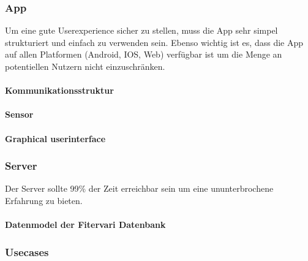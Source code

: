 \documentclass[12pt]{article}
\theoremstyle{definition}
\begin{document}
\subsubsection{App}
Um eine gute Userexperience sicher zu stellen, muss die App sehr simpel strukturiert und einfach zu verwenden sein. Ebenso wichtig ist es, dass die App auf allen Platformen (Android, IOS, Web) verfügbar ist um die Menge an potentiellen Nutzern nicht einzuschränken.

\paragraph{Kommunikationsstruktur}
\begin{center}

\end{center}
\pagebreak
\paragraph{Sensor}
\begin{center}

\end{center}

\paragraph{Graphical userinterface}
\begin{flushleft}

\end{flushleft}

\begin{flushleft}

\end{flushleft}

\subsubsection{Server}
Der Server sollte 99\% der Zeit erreichbar sein um eine ununterbrochene Erfahrung zu bieten.\\
\paragraph{Datenmodel der Fitervari Datenbank}
\begin{center}

\end{center}
\pagebreak

\subsubsection{Usecases}
\end{document}
